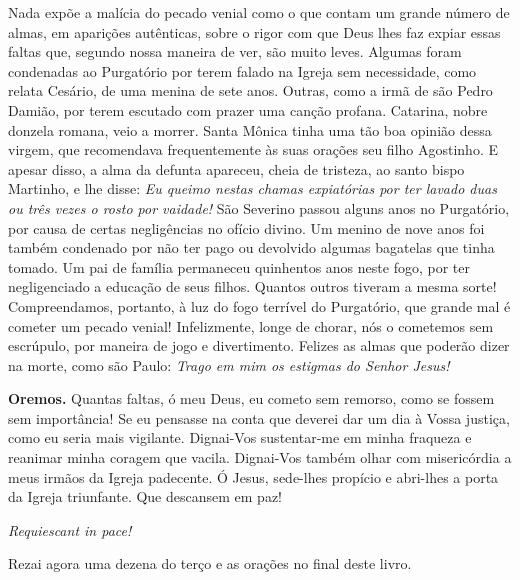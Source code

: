 Nada expõe a malícia do pecado venial como o que contam um grande número de almas, em aparições autênticas, sobre o rigor com que Deus lhes faz expiar essas faltas que, segundo nossa maneira de ver, são muito leves. Algumas foram condenadas ao Purgatório por terem falado na Igreja sem necessidade, como relata Cesário, de uma menina de sete anos. Outras, como a irmã de são Pedro Damião, por terem escutado com prazer uma canção profana. Catarina, nobre donzela romana, veio a morrer. Santa Mônica tinha uma tão boa opinião dessa virgem, que recomendava frequentemente às suas orações seu filho Agostinho. E apesar disso, a alma da defunta apareceu, cheia de tristeza, ao santo bispo Martinho, e lhe disse: \textit{Eu queimo nestas chamas expiatórias por ter lavado duas ou três vezes o rosto por vaidade!} São Severino passou alguns anos no Purgatório, por causa de certas negligências no ofício divino. Um menino de nove anos foi também condenado por não ter pago ou devolvido algumas bagatelas que tinha tomado. Um pai de família permaneceu quinhentos anos neste fogo, por ter negligenciado a educação de seus filhos. Quantos outros tiveram a mesma sorte! Compreendamos, portanto, à luz do fogo terrível do Purgatório, que grande mal é cometer um pecado venial! Infelizmente, longe de chorar, nós o cometemos sem escrúpulo, por maneira de jogo e divertimento. Felizes as almas que poderão dizer na morte, como são Paulo: \textit{Trago em mim os estigmas do Senhor Jesus!}


\vspace{\baselineskip}\noindent \textbf{Oremos.} Quantas faltas, ó meu Deus, eu cometo sem remorso, como se fossem sem importância! Se eu pensasse na conta que deverei dar um dia à Vossa justiça, como eu seria mais vigilante. Dignai-Vos sustentar-me em minha fraqueza e reanimar minha coragem que vacila. Dignai-Vos também olhar com misericórdia a meus irmãos da Igreja padecente. Ó Jesus, sede-lhes propício e abri-lhes a porta da Igreja triunfante. Que descansem em paz!



\begin{center}
\textit{Requiescant in pace!}
\end{center}

Rezai agora uma dezena do terço e as orações no final deste livro.
